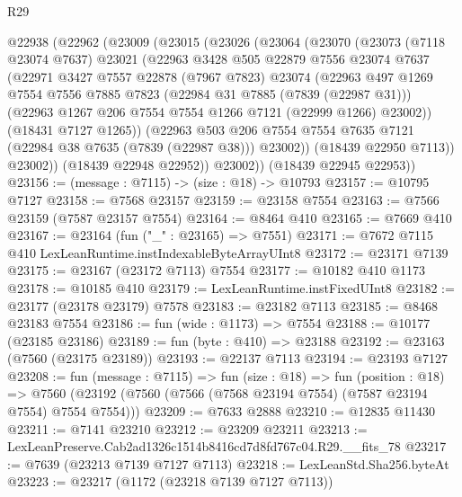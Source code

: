 \begin{lexlean}{R29}
\begin{coremodule}
  @22938
    (@22962
      (@23009
        (@23015
          (@23026
            (@23064
              (@23070
                (@23073
                  (@7118 @23074 @7637)
                  @23021
                  (@22963
                    @3428
                    @505
                    @22879
                    @7556
                    @23074
                    @7637
                    (@22971
                      @3427
                      @7557
                      @22878
                      (@7967 @7823)
                      @23074
                      (@22963
                        @497
                        @1269
                        @7554
                        @7556
                        @7885
                        @7823
                        (@22984 @31 @7885 (@7839 (@22987 @31)))
                        (@22963 @1267 @206 @7554 @7554 @1266 @7121 (@22999 @1266) @23002))
                      (@18431 @7127 @1265))
                    (@22963
                      @503
                      @206
                      @7554
                      @7554
                      @7635
                      @7121
                      (@22984 @38 @7635 (@7839 (@22987 @38)))
                      @23002))
                  (@18439 @22950 @7113))
                @23002))
            (@18439 @22948 @22952))
          @23002))
      (@18439 @22945 @22953))
@23156 := (message : @7115) -> (size : @18) -> @10793
@23157 := @10795 @7127
@23158 := @7568 @23157
@23159 := @23158 @7554
@23163 := @7566 @23159 (@7587 @23157 @7554)
@23164 := @8464 @410
@23165 := @7669 @410
@23167 := @23164 (fun ("_" : @23165) => @7551)
@23171 := @7672 @7115 @410 LexLeanRuntime.instIndexableByteArrayUInt8
@23172 := @23171 @7139
@23175 := @23167 (@23172 @7113) @7554
@23177 := @10182 @410 @1173
@23178 := @10185 @410
@23179 := LexLeanRuntime.instFixedUInt8
@23182 := @23177 (@23178 @23179) @7578
@23183 := @23182 @7113
@23185 := @8468 @23183 @7554
@23186 := fun (wide : @1173) => @7554
@23188 := @10177 (@23185 @23186)
@23189 := fun (byte : @410) => @23188
@23192 := @23163 (@7560 (@23175 @23189))
@23193 := @22137 @7113
@23194 := @23193 @7127
@23208 := fun (message : @7115) =>
  fun (size : @18) =>
  fun (position : @18) =>
  @7560 (@23192 (@7560 (@7566 (@7568 @23194 @7554) (@7587 @23194 @7554) @7554 @7554)))
@23209 := @7633 @2888
@23210 := @12835 @11430
@23211 := @7141 @23210
@23212 := @23209 @23211
@23213 := LexLeanPreserve.Cab2ad1326c1514b8416cd7d8fd767c04.R29.__fits_78
@23217 := @7639 (@23213 @7139 @7127 @7113)
@23218 := LexLeanStd.Sha256.byteAt
@23223 := @23217 (@1172 (@23218 @7139 @7127 @7113))

\end{coremodule}
\end{lexlean}
